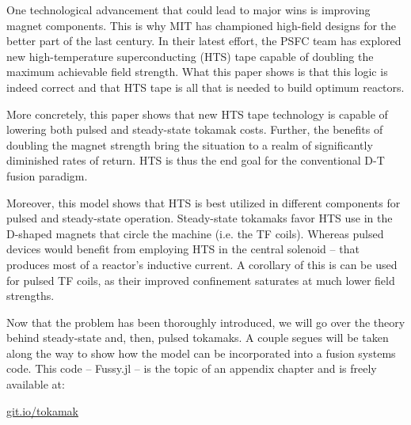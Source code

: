 One technological advancement that could lead to major wins is improving magnet components. This is why MIT has championed high-field designs for the better part of the last century. In their latest effort, the PSFC team has explored new high-temperature superconducting (HTS) tape capable of doubling the maximum achievable field strength. What this paper shows is that this logic is indeed correct and that HTS tape is all that is needed to build optimum reactors.

More concretely, this paper shows that new HTS tape technology is capable of lowering both pulsed and steady-state tokamak costs. Further, the benefits of doubling the magnet strength bring the situation to a realm of significantly diminished rates of return. HTS is thus the end goal for the conventional D-T fusion paradigm. 

Moreover, this model shows that HTS is best utilized in different components for pulsed and steady-state operation. Steady-state tokamaks favor HTS use in the D-shaped magnets that circle the machine (i.e. the TF coils). Whereas pulsed devices would benefit from employing HTS in the central solenoid -- that produces most of a reactor's inductive current. A corollary of this is  can be used for pulsed TF coils, as their improved confinement saturates at much lower field strengths.

Now that the problem has been thoroughly introduced, we will go over the theory behind steady-state and, then, pulsed tokamaks. A couple segues will be taken along the way to show how the model can be incorporated into a fusion systems code. This code -- Fussy.jl -- is the topic of an appendix chapter and is freely available at:
 
{\centering \href{http://git.io/tokamak}{git.io/tokamak} \par }

\clearpage

\newpage


